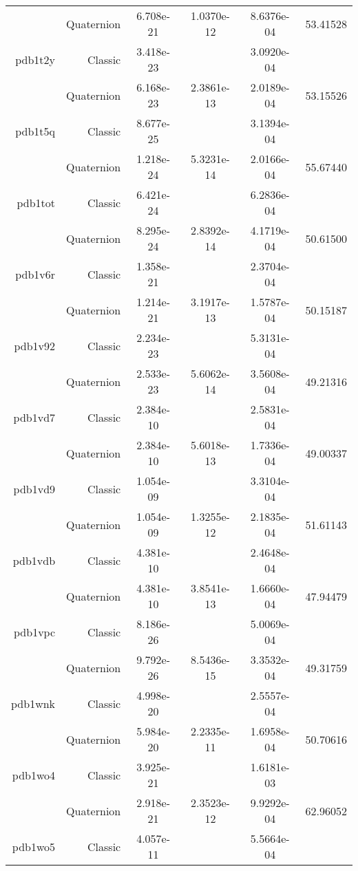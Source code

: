 \begin{xltabular}{\textwidth}{r|rS[table-format=1.3e+2]S[table-format=1.4e+2]S[table-format=1.4e+2]S[table-format=-1.5]}
& Quaternion & 6.708e-21 & 1.0370e-12 & 8.6376e-04 & 53.41528\\  \addlinespace
pdb1t2y & Classic & 3.418e-23 &  & 3.0920e-04 & \\
& Quaternion & 6.168e-23 & 2.3861e-13 & 2.0189e-04 & 53.15526\\  \addlinespace
pdb1t5q & Classic & 8.677e-25 &  & 3.1394e-04 & \\
& Quaternion & 1.218e-24 & 5.3231e-14 & 2.0166e-04 & 55.67440\\  \addlinespace
pdb1tot & Classic & 6.421e-24 &  & 6.2836e-04 & \\
& Quaternion & 8.295e-24 & 2.8392e-14 & 4.1719e-04 & 50.61500\\  \addlinespace
pdb1v6r & Classic & 1.358e-21 &  & 2.3704e-04 & \\
& Quaternion & 1.214e-21 & 3.1917e-13 & 1.5787e-04 & 50.15187\\  \addlinespace
pdb1v92 & Classic & 2.234e-23 &  & 5.3131e-04 & \\
& Quaternion & 2.533e-23 & 5.6062e-14 & 3.5608e-04 & 49.21316\\  \addlinespace
pdb1vd7 & Classic & 2.384e-10 &  & 2.5831e-04 & \\
& Quaternion & 2.384e-10 & 5.6018e-13 & 1.7336e-04 & 49.00337\\  \addlinespace
pdb1vd9 & Classic & 1.054e-09 &  & 3.3104e-04 & \\
& Quaternion & 1.054e-09 & 1.3255e-12 & 2.1835e-04 & 51.61143\\  \addlinespace
pdb1vdb & Classic & 4.381e-10 &  & 2.4648e-04 & \\
& Quaternion & 4.381e-10 & 3.8541e-13 & 1.6660e-04 & 47.94479\\  \addlinespace
pdb1vpc & Classic & 8.186e-26 &  & 5.0069e-04 & \\
& Quaternion & 9.792e-26 & 8.5436e-15 & 3.3532e-04 & 49.31759\\  \addlinespace
pdb1wnk & Classic & 4.998e-20 &  & 2.5557e-04 & \\
& Quaternion & 5.984e-20 & 2.2335e-11 & 1.6958e-04 & 50.70616\\  \addlinespace
pdb1wo4 & Classic & 3.925e-21 &  & 1.6181e-03 & \\
& Quaternion & 2.918e-21 & 2.3523e-12 & 9.9292e-04 & 62.96052\\  \addlinespace
pdb1wo5 & Classic & 4.057e-11 &  & 5.5664e-04 & \\

\end{xltabular}
